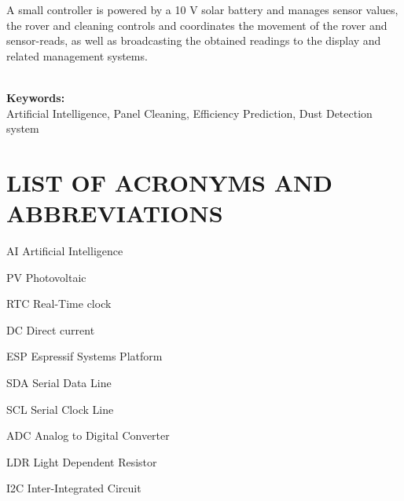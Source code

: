 \documentclass[10pt]{report}
\begin{document}
\begin{sloppypar}
{{{\begin{sloppypar}
{A small controller is powered by a 10 V solar battery and
manages sensor values, the rover and cleaning controls and coordinates the movement of the rover and sensor-reads, as well as broadcasting the obtained readings to
the display and related management systems.


 }\\
\vspace{0.5cm}
\noindent \textbf{Keywords:}\\

Artificial Intelligence, Panel Cleaning, Efficiency Prediction, Dust Detection system
\textbf{}
\newpage
\renewcommand*\listfigurename{LIST OF FIGURES}
\listoffigures
\newpage
\renewcommand{\listtablename}{LIST OF TABLES}
\listoftables
\newpage
{}
\chapter*{LIST OF ACRONYMS AND ABBREVIATIONS}
\begin{abbrv}
\item[AI] Artificial Intelligence
\item[PV] Photovoltaic
\item[RTC] Real-Time clock
\item[DC] Direct current
\item[ESP] Espressif Systems Platform
\item[SDA] Serial Data Line
\item [SCL] Serial Clock Line
\item [ADC] Analog to Digital Converter
\item [LDR] Light Dependent Resistor
\item [I2C] Inter-Integrated Circuit
\item 
\item
\item 
\item 
\item 
\item 
\item 
\item 
\end{abbrv}
\newpage
\renewcommand*\contentsname{TABLE OF CONTENTS}
\tableofcontents
{}
\thispagestyle{empty}

\end{sloppypar}}}}
\end{sloppypar}
\end{document}
